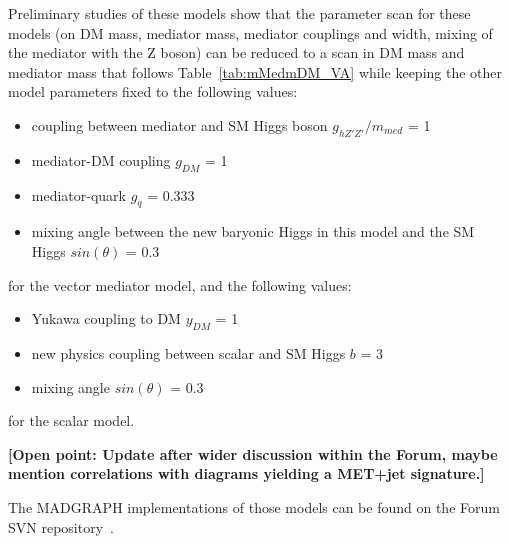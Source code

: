\documentclass[debug,notitlepage]{dmfm}
\begin{document}
Preliminary studies of these models show that the parameter scan for 
these models (on DM mass, mediator mass, mediator couplings and
width, mixing of the mediator with the Z boson) can be reduced to 
a scan in DM mass and mediator mass that follows Table~\ref{tab:mMedmDM_VA} while keeping 
the other model parameters fixed to the following values: 
\begin{itemize}
 \item coupling between mediator and SM Higgs boson $g_{hZ'Z'}/m_{med}$ = 1
 \item mediator-DM coupling $g_{DM}$ = 1
 \item mediator-quark $g_{q}$ = 0.333
 \item mixing angle between the new baryonic Higgs in this model and the SM Higgs $sin(\theta)$ = 0.3
\end{itemize}
for the vector mediator model, and the following values: 
\begin{itemize}
 \item Yukawa coupling to DM $y_{DM}$ = 1
 \item new physics coupling between scalar and SM Higgs $b$ = 3
 \item mixing angle $sin(\theta)$ = 0.3
\end{itemize}
for the scalar model. 

\textbf{[Open point: Update after wider discussion within the Forum, 
maybe mention correlations with diagrams yielding a MET+jet signature.]}

The MADGRAPH implementations of those models can be found on the Forum SVN 
repository~\cite{ForumSVN_EWMonoHiggs}.


\end{document}
